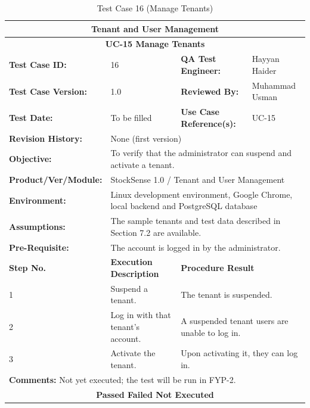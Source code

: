 \documentclass{StockSense}
\begin{document}
\begin{table}[!htbp]
\centering
\caption{Test Case 16 (Manage Tenants)}
{\small\linespread{1}\selectfont\renewcommand{\arraystretch}{1.25}
\begin{tabular}{|p{}|p{}|p{}|p{}|}
\hline
\multicolumn{4}{|c|}{\textbf{Tenant and User Management}} \\ \hline
\multicolumn{4}{|c|}{\textbf{UC-15 Manage Tenants}} \\ \hline
\textbf{Test Case ID:} & 16 & \textbf{QA Test Engineer:} & Hayyan Haider \\ \hline
\textbf{Test Case Version:} & 1.0 & \textbf{Reviewed By:} & Muhammad Usman \\ \hline
\textbf{Test Date:} & To be filled & \textbf{Use Case Reference(s):} & UC-15 \\ \hline
\textbf{Revision History:} & \multicolumn{3}{p{\dimexpr0.70\textwidth+4\tabcolsep\relax}|}{None (first version)} \\ \hline
\textbf{Objective:} & \multicolumn{3}{p{\dimexpr0.70\textwidth+4\tabcolsep\relax}|}{To verify that the administrator can suspend and activate a tenant.} \\ \hline
\textbf{Product/Ver/Module:} & \multicolumn{3}{p{\dimexpr0.70\textwidth+4\tabcolsep\relax}|}{StockSense 1.0 / Tenant and User Management} \\ \hline
\textbf{Environment:} & \multicolumn{3}{p{\dimexpr0.70\textwidth+4\tabcolsep\relax}|}{Linux development environment, Google Chrome, local backend and PostgreSQL database} \\ \hline
\textbf{Assumptions:} & \multicolumn{3}{p{\dimexpr0.70\textwidth+4\tabcolsep\relax}|}{The sample tenants and test data described in Section 7.2 are available.} \\ \hline
\textbf{Pre-Requisite:} & \multicolumn{3}{p{\dimexpr0.70\textwidth+4\tabcolsep\relax}|}{The account is logged in by the administrator.} \\ \hline
\textbf{Step No.} & \textbf{Execution Description} & \multicolumn{2}{l|}{\textbf{Procedure Result}} \\ \hline
1 & Suspend a tenant. & \multicolumn{2}{p{\dimexpr0.42\textwidth+2\tabcolsep\relax}|}{The tenant is suspended.} \\ \hline
2 & Log in with that tenant's account. & \multicolumn{2}{p{\dimexpr0.42\textwidth+2\tabcolsep\relax}|}{A suspended tenant users are unable to log in.} \\ \hline
3 & Activate the tenant. & \multicolumn{2}{p{\dimexpr0.42\textwidth+2\tabcolsep\relax}|}{Upon activating it, they can log in.} \\ \hline
\multicolumn{4}{|l|}{\textbf{Comments:} Not yet executed; the test will be run in FYP-2.} \\ \hline
\multicolumn{4}{|c|}{\textbf{Passed \quad Failed \quad Not Executed}} \\ \hline
\end{tabular}\par}
\end{table}
\end{document}
